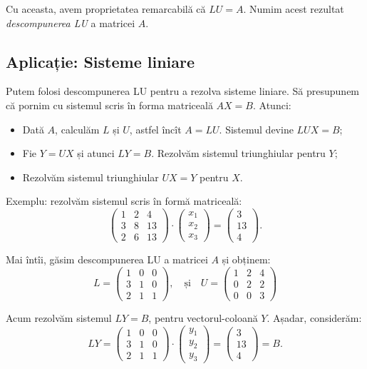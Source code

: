 \documentclass[11pt,a4paper]{article}
\theoremstyle{dotless}
\theoremstyle{dotlessdr}
\begin{document}
Cu aceasta, avem proprietatea remarcabilă că $LU = A$. Numim acest rezultat
\emph{descompunerea LU} a matricei $A$.

\subsection{Aplicație: Sisteme liniare}

Putem folosi descompunerea LU pentru a rezolva sisteme liniare. Să presupunem
că pornim cu sistemul scris în forma matriceală $AX = B$. Atunci:
\begin{itemize}
  \item Dată $A$, calculăm $L$ și $U$, astfel încît $A = LU$. Sistemul devine $LUX = B$;
  \item Fie $Y = UX$ și atunci $LY = B$. Rezolvăm sistemul triunghiular pentru $Y$;
  \item Rezolvăm sistemul triunghiular $UX = Y$ pentru $X$.
\end{itemize}

Exemplu: rezolvăm sistemul scris în formă matriceală:
\[
  \begin{pmatrix}
    1 & 2 & 4 \\
    3 & 8 & 13 \\
    2 & 6 & 13
  \end{pmatrix} \cdot
  \begin{pmatrix}
    x_1 \\
    x_2 \\
    x_3
  \end{pmatrix} =
  \begin{pmatrix}
    3 \\
    13 \\
    4
  \end{pmatrix}.
\]

Mai întîi, găsim descompunerea LU a matricei $A$ și obținem:
\[
  L = \begin{pmatrix}
    1 & 0 & 0 \\
    3 & 1 & 0 \\
    2 & 1 & 1
  \end{pmatrix}, \quad \text{și} \quad
  U = \begin{pmatrix}
    1 & 2 & 4 \\
    0 & 2 & 2 \\
    0 & 0 & 3
  \end{pmatrix}
\]

Acum rezolvăm sistemul $LY = B$, pentru vectorul-coloană $Y$. Așadar,
considerăm:
\[
  LY = \begin{pmatrix}
    1 & 0 & 0 \\
    3 & 1 & 0 \\
    2 & 1 & 1
  \end{pmatrix} \cdot
  \begin{pmatrix}
    y_1 \\
    y_2 \\
    y_3
  \end{pmatrix} =
  \begin{pmatrix}
    3 \\ 13 \\ 4
  \end{pmatrix} = B.
\]
\end{document}

